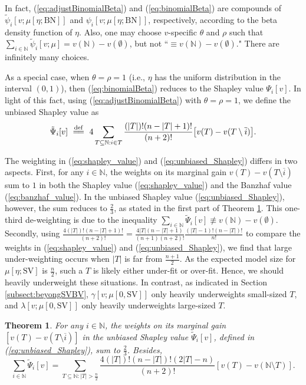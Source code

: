 \documentclass[a4paper,12pt]{article}
\newtheorem{theorem}{Theorem}
\newcommand{\eqdef}{\overset{\mathrm{def}}{=\joinrel=}}
\begin{document}
In fact, (\ref{eq:adjustBinomialBeta}) and (\ref{eq:binomialBeta}) are compounds of  $\tilde \psi_i[v; \mu [\eta; \mathrm{BN}] ]$ and $\psi_i[v; \mu [\eta; \mathrm{BN}] ]$, respectively, according to the beta density function of $\eta$. 
Also, one may choose $v$-specific $\theta$ and $\rho$ such that $\sum\limits_{i\in \mathbb{N}} \tilde \psi_i[v; \mu] = v(\mathbb{N})-v(\emptyset)$, but not ``$\equiv v(\mathbb{N})-v(\emptyset)$."
There are infinitely many choices.

As a special case, when $\theta=\rho=1$ (i.e., $\eta$ has the uniform distribution in the interval $(0,1)$), 
then (\ref{eq:binomialBeta}) reduces to the Shapley value $\Psi_i[v]$. In light of this fact, using (\ref{eq:adjustBinomialBeta}) with $\theta=\rho=1$, we define
the unbiased Shapley value as
\begin{equation}\label{eq:unbiased_Shapley}
\tilde \Psi_i[v] \
\eqdef \ 4 \sum\limits_{T\subseteq \mathbb{N}: i \in T} \frac{(|T|)! (n-|T|+1)!}{ (n+2)!} \big[ v(T)-v(T\setminus \overline{i}) \big].
\end{equation}

The weighting in (\ref{eq:shapley_value}) and (\ref{eq:unbiased_Shapley}) differs in two aspects.
First, for any $i\in \mathbb{N}$,  the weights on its marginal gain $v(T)-v(T\setminus \overline{i})$ sum to $1$ in
both the Shapley value (\ref{eq:shapley_value}) and the Banzhaf value (\ref{eq:banzhaf_value}). 
In the unbiased Shapley value (\ref{eq:unbiased_Shapley}), however, the sum reduces to $\frac{2}{3}$, as stated in the first part of Theorem \ref{thm:UShapleyValueWeights}. 
This one-third de-weighting is due to the inequality $\sum\limits_{i\in\mathbb{N}} \tilde \Psi_i[v]  \not \equiv v(\mathbb{N})-v(\emptyset)$.
Secondly, using $\frac{4(|T|)! (n-|T|+1)!}{ (n+2)!} = \frac{4 |T| (n-|T|+1)}{ (n+1)(n+2)!} \frac{(|T|-1)! (n-|T|)!}{n!}$ to compare the weights in (\ref{eq:shapley_value}) and (\ref{eq:unbiased_Shapley}), we find that large under-weighting occurs when
$|T|$ is far from $\frac{n+1}{2}$. As the expected model size for $\mu [\eta; \mathrm{SV}]$ is $\frac{n}{2}$, such a $T$ is likely either under-fit or over-fit. 
Hence, we should heavily underweight these situations.
In contrast, as indicated in Section \ref{subsect:beyongSVBV}, $\gamma[v;\mu[0,\mathrm{SV}]]$ only heavily underweights small-sized $T$, and $\lambda[v;\mu[0,\mathrm{SV}]]$ only heavily underweights large-sized $T$.

\begin{theorem} \label{thm:UShapleyValueWeights}
For any $i\in \mathbb{N}$, the weights on its marginal gain $[v(T)-v(T\setminus \overline{i})]$ in the unbiased Shapley value $\tilde \Psi_i[v]$, defined in (\ref{eq:unbiased_Shapley}), sum to $\frac{2}{3}$.
Besides,
\begin{equation} \label{eq:total_unbiased_shapley}
\sum\limits_{i \in \mathbb{N}} \tilde \Psi_i[v] 
= 
\sum\limits_{T \subseteq \mathbb{N}: |T| > \frac{n}{2}}  \frac{4(|T|)!(n-|T|)!(2|T|-n)}{(n+2)!} \left [ v(T) - v(\mathbb{N} \setminus T)\right ].
\end{equation}
\end{theorem}
\end{document}

